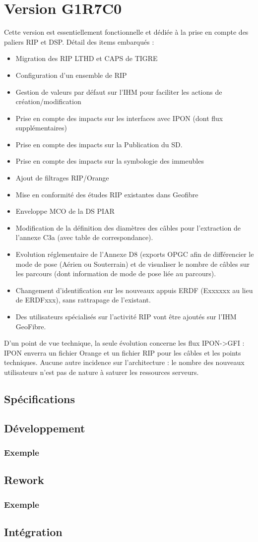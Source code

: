 \chapter{Version G1R7C0}
Cette version est essentiellement  fonctionnelle et dédiée à la prise en compte des paliers RIP et DSP.
Détail des items embarqués :
\begin{itemize}
\item Migration des RIP LTHD et CAPS de TIGRE
\item Configuration d’un ensemble de RIP
\item Gestion de valeurs par défaut sur l’IHM pour faciliter les actions de création/modification
\item Prise en compte des impacts sur les interfaces avec IPON (dont flux supplémentaires)
\item Prise en compte des impacts sur la Publication du SD.
\item Prise en compte des impacts sur la symbologie des immeubles
\item Ajout de filtrages RIP/Orange
\item Mise en conformité des études RIP existantes dans Geofibre
\item	Enveloppe MCO de la DS PIAR
\item Modification de la définition des diamètres des câbles pour l'extraction de l'annexe C3a (avec table de correspondance).
\item Evolution réglementaire de l’Annexe D8 (exports OPGC afin de différencier le mode de pose (Aérien ou Souterrain) et de visualiser le nombre de câbles sur les parcours (dont information de mode de pose liée au parcours).
\item Changement d’identification sur les nouveaux appuis ERDF (Exxxxxx au lieu de ERDFxxx), sans rattrapage de l’existant.
\item Des utilisateurs spécialisés sur l’activité RIP vont être ajoutés sur l’IHM GeoFibre.
\end{itemize}
D’un point de vue technique, la seule évolution concerne les flux IPON->GFI : IPON enverra un fichier Orange et un fichier RIP pour les câbles et les points techniques.
Aucune autre incidence sur l’architecture : le nombre des  nouveaux utilisateurs n’est pas de nature à saturer les ressources serveurs.

\section{Spécifications}
\section{Développement}
\subsection{Exemple}
\section{Rework}
\subsection{Exemple}
\section{Intégration}

